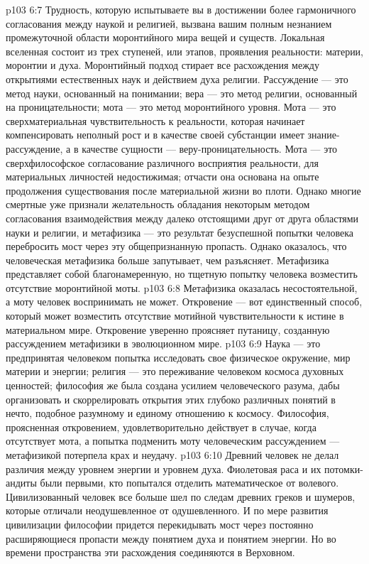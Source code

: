 \vs p103 6:7 Трудность, которую испытываете вы в достижении более гармоничного согласования между наукой и религией, вызвана вашим полным незнанием промежуточной области моронтийного мира вещей и существ. Локальная вселенная состоит из трех ступеней, или этапов, проявления реальности: материи, моронтии и духа. Моронтийный подход стирает все расхождения между открытиями естественных наук и действием духа религии. Рассуждение --- это метод науки, основанный на понимании; вера --- это метод религии, основанный на проницательности; мота --- это метод моронтийного уровня. Мота --- это сверхматериальная чувствительность к реальности, которая начинает компенсировать неполный рост и в качестве своей субстанции имеет знание\hyp{}рассуждение, а в качестве сущности --- веру\hyp{}проницательность. Мота --- это сверхфилософское согласование различного восприятия реальности, для материальных личностей недостижимая; отчасти она основана на опыте продолжения существования после материальной жизни во плоти. Однако многие смертные уже признали желательность обладания некоторым методом согласования взаимодействия между далеко отстоящими друг от друга областями науки и религии, и метафизика --- это результат безуспешной попытки человека перебросить мост через эту общепризнанную пропасть. Однако оказалось, что человеческая метафизика больше запутывает, чем разъясняет. Метафизика представляет собой благонамеренную, но тщетную попытку человека возместить отсутствие моронтийной моты.
\vs p103 6:8 \pc Метафизика оказалась несостоятельной, а моту человек воспринимать не может. Откровение --- вот единственный способ, который может возместить отсутствие мотийной чувствительности к истине в материальном мире. Откровение уверенно проясняет путаницу, созданную рассуждением метафизики в эволюционном мире.
\vs p103 6:9 Наука --- это предпринятая человеком попытка исследовать свое физическое окружение, мир материи и энергии; религия --- это переживание человеком космоса духовных ценностей; философия же была создана усилием человеческого разума, дабы организовать и скоррелировать открытия этих глубоко различных понятий в нечто, подобное разумному и единому отношению к космосу. Философия, проясненная откровением, удовлетворительно действует в случае, когда отсутствует мота, а попытка подменить моту человеческим рассуждением --- метафизикой потерпела крах и неудачу.
\vs p103 6:10 \pc Древний человек не делал различия между уровнем энергии и уровнем духа. Фиолетовая раса и их потомки\hyp{}андиты были первыми, кто попытался отделить математическое от волевого. Цивилизованный человек все больше шел по следам древних греков и шумеров, которые отличали неодушевленное от одушевленного. И по мере развития цивилизации философии придется перекидывать мост через постоянно расширяющиеся пропасти между понятием духа и понятием энергии. Но во времени пространства эти расхождения соединяются в Верховном.
